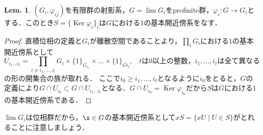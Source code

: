 \documentclass[dvipdfmx,b5paper,papersize]{jsarticle}
\theoremstyle{definition}
\newtheorem{lem}[thm]{Lem.}
\DeclareMathOperator{\Ker}{Ker}
\begin{document}
\begin{lem}\label{thm:nbd}
  $(G_i, \varphi_{ij})$を有限群の射影系，$G=\lim G_i$をprofinite群，$\varphi_i \colon G \to G_i$とする．このとき$S=\{\Ker \varphi_i \}_i$は$G$における$1$の基本開近傍系をなす．
\end{lem}
\begin{proof}
  直積位相の定義と$G_i$が離散空間であることより，$\prod_i G_i$における$1$の基本開近傍系として
  \[
    U_{i_1 \dots i_t}=\prod_{i \neq i_1, \dots ,i_t}G_i \times \{1\}_G_{{i_1}} \times \dots \times \{1\}_{G{i_t}},\hspace{10pt} \text{$t$は$0$以上の整数，$i_1, \dots ,i_t$は全て異なる}
  \]
  の形の開集合の族が取れる．
  ここで$i_0 \geq i_1, \dots ,i_t$となるように$i_0$をとると，$G$の定義により$G \cap U_{i_0} \subset G \cap U_{i_1 \dots i_t}$となる．$G \cap U_{i_0}=\Ker \varphi_{i_0}$だから$S$は$G$における$1$の基本開近傍系である．
\end{proof}

$\lim G_i$は位相群だから，$\x \in G$の基本開近傍系として$xS = \{ xU \mid U \in S\}$がとれることに注意しましょう．
\end{document}
